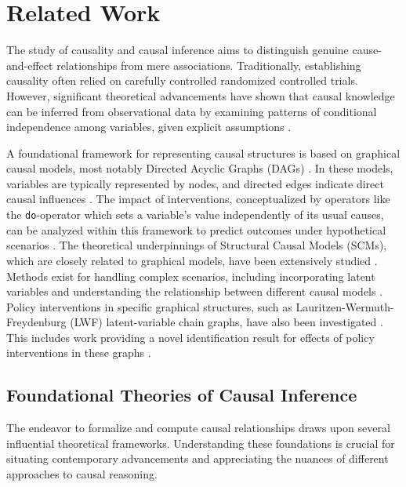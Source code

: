 
\section{Related Work}
\label{sec:relaeted_work}

The study of causality and causal inference aims to distinguish genuine cause-and-effect relationships from mere associations. Traditionally, establishing causality often relied on carefully controlled randomized controlled trials. However, significant theoretical advancements have shown that causal knowledge can be inferred from observational data by examining patterns of conditional independence among variables, given explicit assumptions \cite{pearl2018theoretical}.

A foundational framework for representing causal structures is based on graphical causal models, most notably Directed Acyclic Graphs (DAGs) \cite{verma1986causal, pearl1988probabilistic, Glymour2019Review, koller2009probabilistic}. In these models, variables are typically represented by nodes, and directed edges indicate direct causal influences \cite{pearl1988probabilistic}. The impact of interventions, conceptualized by operators like the \texttt{do}-operator which sets a variable's value independently of its usual causes, can be analyzed within this framework to predict outcomes under hypothetical scenarios \cite{pearl1988probabilistic, Pearl2009Causality}. The theoretical underpinnings of Structural Causal Models (SCMs), which are closely related to graphical models, have been extensively studied \cite{pearl2000causality, Peters2017Elements, bareinboim2020causal, janzing2016algorithmic, Peters2022Causal}. Methods exist for handling complex scenarios, including incorporating latent variables \cite{Mohan2021Graphical, richardson2003causal} and understanding the relationship between different causal models \cite{Verma1990Equivalence, pearl2018theoretical}. Policy interventions in specific graphical structures, such as Lauritzen-Wermuth-Freydenburg (LWF) latent-variable chain graphs, have also been investigated \cite{sherman2020general}. This includes work providing a novel identification result for effects of policy interventions in these graphs \cite{sherman2020general}.

\subsection{Foundational Theories of Causal Inference}
\label{subsec:foundational_theories}

The endeavor to formalize and compute causal relationships draws upon several influential theoretical frameworks. Understanding these foundations is crucial for situating contemporary advancements and appreciating the nuances of different approaches to causal reasoning.

